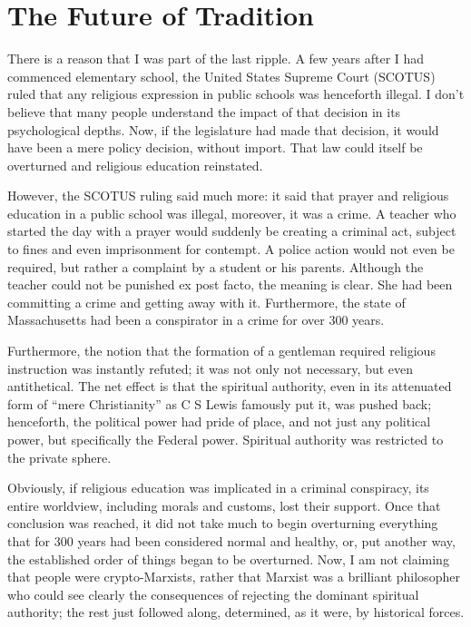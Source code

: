 \section{The Future of Tradition}

There is a reason that I was part of the last ripple. A few years after I had commenced elementary school, the United States Supreme Court (SCOTUS) ruled that any religious expression in public schools was henceforth illegal. I don't believe that many people understand the impact of that decision in its psychological depths. Now, if the legislature had made that decision, it would have been a mere policy decision, without import. That law could itself be overturned and religious education reinstated.

However, the SCOTUS ruling said much more: it said that prayer and religious education in a public school was illegal, moreover, it was a crime. A teacher who started the day with a prayer would suddenly be creating a criminal act, subject to fines and even imprisonment for contempt. A police action would not even be required, but rather a complaint by a student or his parents. Although the teacher could not be punished ex post facto, the meaning is clear. She had been committing a crime and getting away with it. Furthermore, the state of Massachusetts had been a conspirator in a crime for over 300 years.

Furthermore, the notion that the formation of a gentleman required religious instruction was instantly refuted; it was not only not necessary, but even antithetical. The net effect is that the spiritual authority, even in its attenuated form of ``mere Christianity'' as C S Lewis famously put it, was pushed back; henceforth, the political power had pride of place, and not just any political power, but specifically the Federal power. Spiritual authority was restricted to the private sphere.

Obviously, if religious education was implicated in a criminal conspiracy, its entire worldview, including morals and customs, lost their support. Once that conclusion was reached, it did not take much to begin overturning everything that for 300 years had been considered normal and healthy, or, put another way, the established order of things began to be overturned. Now, I am not claiming that people were crypto-Marxists, rather that Marxist was a brilliant philosopher who could see clearly the consequences of rejecting the dominant spiritual authority; the rest just followed along, determined, as it were, by historical forces.

